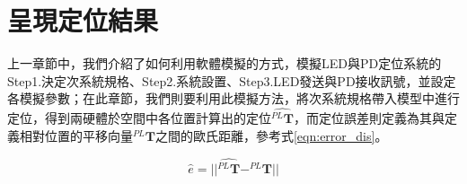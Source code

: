 \section{呈現定位結果}
\label{chp:simulate_result}

上一章節中，我們介紹了如何利用軟體模擬的方式，模擬LED與PD定位系統的Step1.決定次系統規格、Step2.系統設置、Step3.LED發送與PD接收訊號，並設定各模擬參數；在此章節，我們則要利用此模擬方法，將次系統規格帶入模型中進行定位，得到兩硬體於空間中各位置計算出的定位$\hat{^{PL}\boldsymbol{T}}$，而定位誤差則定義為其與定義相對位置的平移向量$^{PL}\boldsymbol{T}$之間的歐氏距離，參考式\ref{eqn:error_dis}。


\begin{equation}
    \label{eqn:error_dis}
    \hat{e} = ||\hat{^{PL}\boldsymbol{T}}-^{PL}\boldsymbol{T}||
\end{equation}














